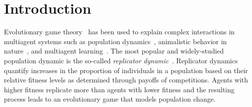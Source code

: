 \documentclass{aamas2014}
\begin{document}




\section{Introduction}


Evolutionary game theory~\cite{MaynardSmith82,Gintis09} has been used to explain complex interactions in multiagent 
systems such as population dynamics~\cite{HS98}, animalistic behavior in nature~\cite{MSP73}, and 
multiagent learning~\cite{Tuyls07What}. The most popular and widely-studied population dynamic is the
so-called {\it replicator dynamic}~\cite{TJ78}. Replicator dynamics quantify 
increases in the proportion of individuals in a population based on their relative fitness levels as determined through 
payoffs of competitions. Agents with higher fitness replicate more than agents with lower fitness and the resulting 
process leads to an evolutionary game that models population change. 
\end{document}
